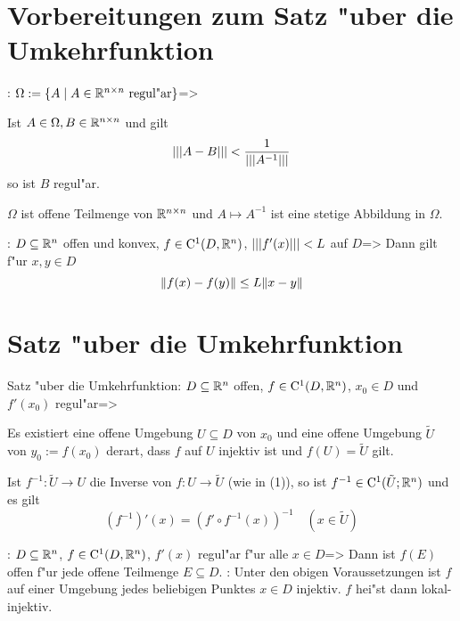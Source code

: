 \section{Vorbereitungen zum Satz "uber die Umkehrfunktion}
\theorem:
  $\Omega:=\{A\mid A\in\mathbb R^{n\times n} \text{ regul"ar}\}$=>{
  \begin{stmts}
    \item Ist $A\in\Omega, B\in \mathbb R^{n\times n}$ und gilt 
      \[{\left|\left|\left|A-B\right|\right|\right|}<\frac 1 {{\left|\left|\left|A^{-1}\right|\right|\right|}}
        \] 
      so ist $B$ regul"ar.
    \item $\Omega$ ist offene Teilmenge von $\mathbb R^{n\times n}$ und 
      $A\mapsto A^{-1}$ ist eine stetige Abbildung in $\Omega$.
    \end{stmts}
  }
\theorem:
  $D\subseteq\mathbb R^n$ offen und konvex, $f\in{\rm C}^1(D,\mathbb R^n)$,
  ${\left|\left|\left|f'(x)\right|\right|\right|}<L$ auf $D$=>{
  Dann gilt f"ur $x,y\in D$
  \[{\left\| f(x)-f(y)\right\|}\leq L{\left\| x-y\right\|}
    \]
  }
\section{Satz "uber die Umkehrfunktion}
\theorem Satz "uber die Umkehrfunktion:
  $D\subseteq\mathbb R^n$ offen, $f\in{\rm C}^1(D,\mathbb R^n)$, $x_0\in D$
  und $f'(x_0)$ regul"ar=>{
  \begin{stmts}
    \item Es existiert eine offene Umgebung $U\subseteq D$ von $x_0$ und 
      eine offene Umgebung $\tilde U$ von $y_0:=f(x_0)$ derart, dass
      $f$ auf $U$ injektiv ist und $f(U)=\tilde U$ gilt.
    \item Ist $f^{-1}:\tilde U\to U$ die Inverse von $f:U\to\tilde U$ 
      (wie in (1)), so ist $f^{-1}\in{\rm C}^1(\tilde U;\mathbb R^n)$ und es gilt
      \[(f^{-1})'(x)=(f'\circ f^{-1}(x))^{-1}\quad (x\in\tilde U)
        \]
    \end{stmts}
  }
\theorem:
  $D\subseteq\mathbb R^n$, $f\in{\rm C}^1(D,\mathbb R^n)$, $f'(x)$ regul"ar 
  f"ur alle $x\in D$=>{
  Dann ist $f(E)$ offen f"ur jede offene Teilmenge $E\subseteq D$.
  }
\remark:{
  Unter den obigen Voraussetzungen ist $f$ auf einer Umgebung jedes
  beliebigen Punktes $x\in D$ injektiv. $f$ hei"st dann lokal-injektiv.
  }
